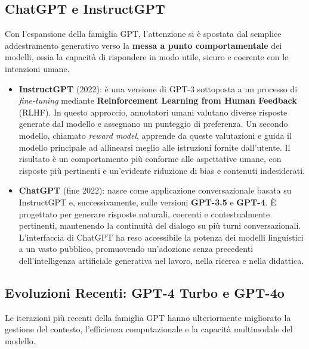 \subsection{ChatGPT e InstructGPT}

Con l’espansione della famiglia GPT, l’attenzione si è spostata dal semplice addestramento generativo verso la \textbf{messa a punto comportamentale} dei modelli, ossia la capacità di rispondere in modo utile, sicuro e coerente con le intenzioni umane.

\begin{itemize}
    \item \textbf{InstructGPT} (2022): è una versione di GPT-3 sottoposta a un processo di \textit{fine-tuning} mediante \textbf{Reinforcement Learning from Human Feedback} (RLHF). In questo approccio, annotatori umani valutano diverse risposte generate dal modello e assegnano un punteggio di preferenza. Un secondo modello, chiamato \textit{reward model}, apprende da queste valutazioni e guida il modello principale ad allinearsi meglio alle istruzioni fornite dall’utente. Il risultato è un comportamento più conforme alle aspettative umane, con risposte più pertinenti e un’evidente riduzione di bias e contenuti indesiderati.

    \item \textbf{ChatGPT} (fine 2022): nasce come applicazione conversazionale basata su InstructGPT e, successivamente, sulle versioni \textbf{GPT-3.5} e \textbf{GPT-4}. È progettato per generare risposte naturali, coerenti e contestualmente pertinenti, mantenendo la continuità del dialogo su più turni conversazionali. L’interfaccia di ChatGPT ha reso accessibile la potenza dei modelli linguistici a un vasto pubblico, promuovendo un’adozione senza precedenti dell’intelligenza artificiale generativa nel lavoro, nella ricerca e nella didattica.
\end{itemize}

\subsection{Evoluzioni Recenti: GPT-4 Turbo e GPT-4o}

Le iterazioni più recenti della famiglia GPT hanno ulteriormente migliorato la gestione del contesto, l’efficienza computazionale e la capacità multimodale del modello.

